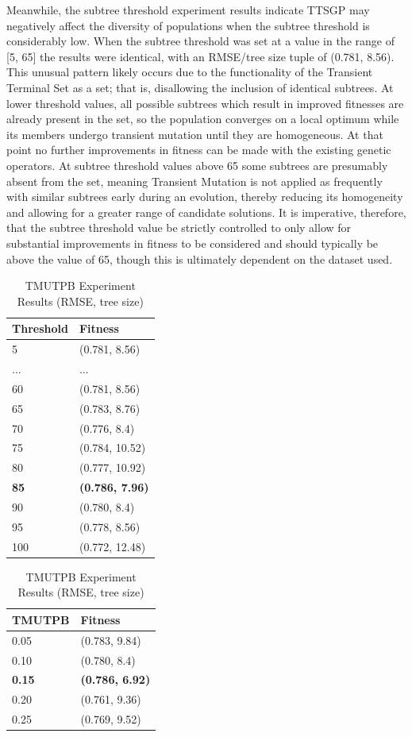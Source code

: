 \documentclass[a4paper, twocolumn]{article}
\begin{document}
Meanwhile, the subtree threshold experiment results indicate TTSGP may negatively affect the diversity of populations when the subtree threshold is considerably low. When the subtree threshold was set at a value in the range of [5, 65] the results were identical, with an RMSE/tree size tuple of (0.781, 8.56). This unusual pattern likely occurs due to the functionality of the Transient Terminal Set as a set; that is, disallowing the inclusion of identical subtrees. At lower threshold values, all possible subtrees which result in improved fitnesses are already present in the set, so the population converges on a local optimum while its members undergo transient mutation until they are homogeneous. At that point no further improvements in fitness can be made with the existing genetic operators. At subtree threshold values above 65 some subtrees are presumably absent from the set, meaning Transient Mutation is not applied as frequently with similar subtrees early during an evolution, thereby reducing its homogeneity and allowing for a greater range of candidate solutions. It is imperative, therefore, that the subtree threshold value be strictly controlled to only allow for substantial improvements in fitness to be considered and should typically be above the value of 65, though this is ultimately dependent on the dataset used.
\newline
\begin{table}[H]
	\begin{center}
		\caption{Threshold Experiment Results (RMSE, tree size)}
		\label{table:Y}
		\begin{tabularx}{\columnwidth}{X|X}
			Threshold&Fitness\\
			\hline
			5&(0.781, 8.56)\\
			...&...\\
			60&(0.781, 8.56)\\
			65&(0.783, 8.76)\\
			70&(0.776, 8.4)\\
			75&(0.784, 10.52)\\
			80&(0.777, 10.92)\\
			\textbf{85}&\textbf{(0.786, 7.96)}\\
			90&(0.780, 8.4)\\
			95&(0.778, 8.56)\\
			100&(0.772, 12.48)\\
		\end{tabularx}
	\end{center}
	\begin{center}
		\caption{TMUTPB Experiment Results (RMSE, tree size)}
		\label{table:Z}
		\begin{tabularx}{\columnwidth}{X|X}
			TMUTPB&Fitness\\
			\hline
			0.05&(0.783, 9.84)\\
			0.10&(0.780, 8.4)\\
			\textbf{0.15}&\textbf{(0.786, 6.92)}\\
			0.20&(0.761, 9.36)\\
			0.25&(0.769, 9.52)\\
		\end{tabularx}
	\end{center}
\end{table}
\end{document}
